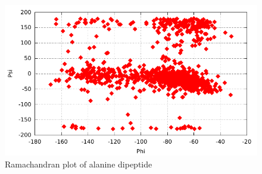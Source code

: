 \documentclass[12pt,a4paper]{scrartcl}
\begin{document}
\begin{figure}[H]
	\centering
	\includegraphics{./plt/rama.pdf}
	\caption{Ramachandran plot of alanine dipeptide}\label{fig:ala}
\end{figure}
\end{document}
